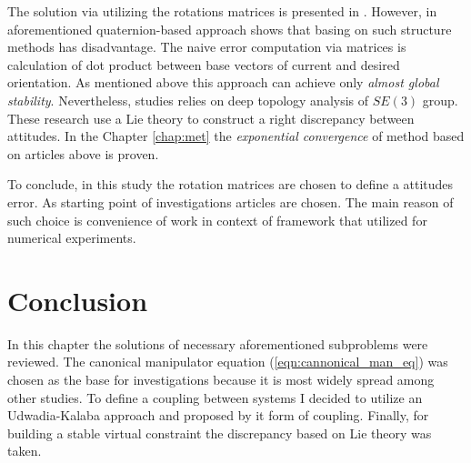 The solution via utilizing the rotations matrices is presented in 
\cite{GeomControlQuadSE3,RigidBodyAttCon,OutFeedbackStabForOrbRob,
ANonlinearObserverUsingPose}. However, in aforementioned quaternion-based 
approach shows that basing on such structure methods has disadvantage. 
The naive error computation via matrices is calculation of dot product 
between base vectors of current and desired orientation. As mentioned 
above this approach can achieve only \emph{almost global stability}. 
Nevertheless, studies \cite{OutFeedbackStabForOrbRob, ANonlinearObserverUsingPose} 
relies on deep topology analysis of $SE(3)$ group. These research use 
a Lie theory to construct a right discrepancy between attitudes. In 
the Chapter \ref{chap:met} the \emph{exponential convergence} of method 
based on articles above is proven.

To conclude, in this study the rotation matrices are chosen to define a 
attitudes error. As starting point of investigations articles 
\cite{OutFeedbackStabForOrbRob,ANonlinearObserverUsingPose} are chosen. 
The main reason of such choice is convenience of work in context of 
framework \cite{Pinocchio} that utilized for numerical experiments.

\section{Conclusion} \label{sec:lr_conclusion}

In this chapter the solutions of necessary aforementioned subproblems 
were reviewed. The canonical manipulator equation (\ref{eqn:cannonical_man_eq}) 
was chosen as the base for investigations because it is most widely spread 
among other studies. To define a coupling between systems I decided to 
utilize an Udwadia-Kalaba approach and proposed by it form of coupling. 
Finally, for building a stable virtual constraint the discrepancy based 
on Lie theory was taken.
